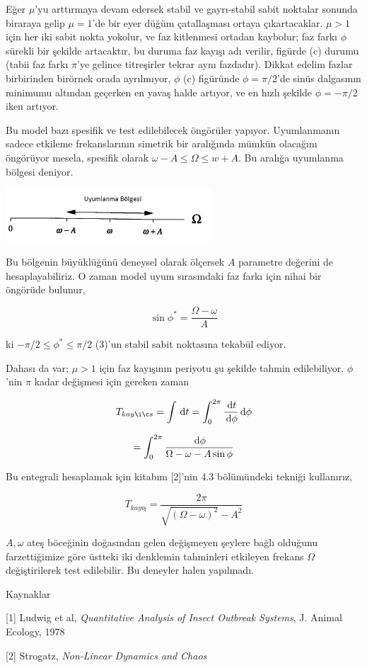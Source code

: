 \documentclass[12pt,fleqn]{article}\usepackage{../../common}
\begin{document}
Eğer $\mu$'yu arttırmaya devam edersek stabil ve gayrı-stabil sabit noktalar
sonunda biraraya gelip $\mu=1$'de bir eyer düğüm çatallaşması ortaya
çıkartacaklar. $\mu>1$ için her iki sabit nokta yokolur, ve faz kitlenmesi
ortadan kaybolur; faz farkı $\phi$ sürekli bir şekilde artacaktır, bu duruma faz
kayışı adı verilir, figürde (c) durumu (tabii faz farkı $\pi$'ye gelince
titreşirler tekrar aynı fazdadır). Dikkat edelim fazlar birbirinden birörnek
orada ayrılmıyor, $\phi$ (c) figüründe $\phi=\pi/2$'de sinüs dalgasının minimumu
altından geçerken en yavaş halde artıyor, ve en hızlı şekilde $\phi=-\pi/2$ iken
artıyor.

Bu model bazı spesifik ve test edilebilecek öngörüler yapıyor. Uyumlanmanın
sadece etkileme frekanslarının simetrik bir aralığında mümkün olacağını
öngörüyor mesela, spesifik olarak $\omega - A \le \Omega \le w + A$. Bu aralığa
uyumlanma bölgesi deniyor.

\includegraphics[height=2cm]{04_16.png}

Bu bölgenin büyüklüğünü deneysel olarak ölçersek $A$ parametre değerini de
hesaplayabiliriz. O zaman model uyum sırasındaki faz farkı için nihai bir
öngörüde bulunur,

$$ \sin\phi^* = \frac{\Omega-\omega}{A} $$

ki $-\pi/2 \le \phi^* \le \pi/2$ (3)'un stabil sabit noktasına tekabül ediyor.

Dahası da var; $\mu > 1$ için faz kayışının periyotu şu şekilde tahmin
edilebiliyor. $\phi$'nin $\pi$ kadar değişmesi için gereken zaman

$$ T_{kayış} =
\int \ud t = \int _{0}^{2\pi} \frac{\ud t}{\ud \phi} \ud \phi $$

$$
= \int _{0}^{2\pi} \frac{\,\mathrm{d} \phi}{\Omega - \omega - A\sin\phi}
$$

Bu entegrali hesaplamak için kitabım [2]'nin 4.3 bölümündeki tekniği kullanırız,

$$ T_{kayış} = \frac{2\pi}{\sqrt{(\Omega-\omega)^2} - A^2} $$

$A,\omega$ ateş böceğinin doğasından gelen değişmeyen şeylere bağlı olduğunu
farzettiğimize göre üstteki iki denklemin tahminleri etkileyen frekans $\Omega$
değiştirilerek test edilebilir. Bu deneyler halen yapılmadı. 

Kaynaklar

[1] Ludwig et al, {\em Quantitative Analysis of Insect Outbreak Systems},
J. Animal Ecology, 1978

[2] Strogatz, {\em Non-Linear Dynamics and Chaos}
\end{document}
